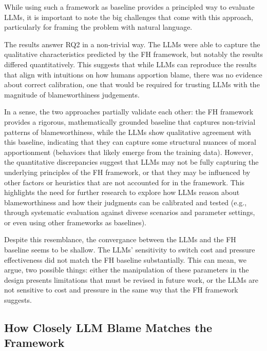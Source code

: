 \documentclass{article}
\begin{document}
While using such a framework as baseline provides a principled way to evaluate LLMs, it is important to note the big challenges that come with this approach, particularly for framing the problem with natural language. 

The results answer RQ2 in a non-trivial way. The LLMs were able to capture the qualitative characteristics predicted by the FH framework, but notably the results differed quantitatively. This suggests that while LLMs can reproduce the results that align with intuitions on how humans apportion blame, there was no evidence about correct calibration, one that would be required for trusting LLMs with the magnitude of blameworthiness judgements.

In a sense, the two approaches partially validate each other: the FH framework provides a rigorous, mathematically grounded baseline that captures non-trivial patterns of blameworthiness, while the LLMs show qualitative agreement with this baseline, indicating that they can capture some structural nuances of moral apportionment (behaviors that likely emerge from the training data). However, the quantitative discrepancies suggest that LLMs may not be fully capturing the underlying principles of the FH framework, or that they may be influenced by other factors or heuristics that are not accounted for in the framework. This highlights the need for further research to explore how LLMs reason about blameworthiness and how their judgments can be calibrated and tested (e.g., through systematic evaluation against diverse scenarios and parameter settings, or even using other frameworks as baselines).

Despite this resemblance, the convergance between the LLMs and the FH baseline seems to be shallow. The LLMs' sensitivity to switch cost and pressure effectiveness did not match the FH baseline substantially. This can mean, we argue, two possible things: either the manipulation of these parameters in the design presents limitations that must be revised in future work, or the LLMs are not sensitive to cost and pressure in the same way that the FH framework suggests.


\subsection{How Closely LLM Blame Matches the Framework}
\end{document}
